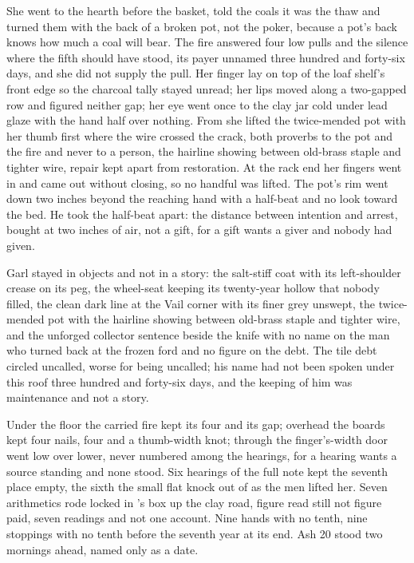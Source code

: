 She went to the hearth before the basket, told the coals it was the thaw and turned them with the back of a broken pot, not the poker, because a pot's back knows how much a coal will bear. The fire answered four low pulls and the silence where the fifth should have stood, its payer unnamed three hundred and forty-six days, and she did not supply the pull. Her finger lay on top of the loaf shelf's front edge so the charcoal tally stayed unread; her lips moved along a two-gapped row and figured neither gap; her eye went once to the clay jar cold under lead glaze with the hand half over nothing. From  she lifted the twice-mended pot with her thumb first where the wire crossed the crack, both proverbs to the pot and the fire and never to a person, the hairline showing between old-brass staple and tighter wire, repair kept apart from restoration. At the rack end her fingers went in and came out without closing, so no handful was lifted. The pot's rim went down two inches beyond the reaching hand with a half-beat and no look toward the bed. He took the half-beat apart: the distance between intention and arrest, bought at two inches of air, not a gift, for a gift wants a giver and nobody had given.

Garl stayed in objects and not in a story: the salt-stiff coat with its left-shoulder crease on its peg, the wheel-seat keeping its twenty-year hollow that nobody filled, the clean dark line at the Vail corner with its finer grey unswept, the twice-mended pot with the hairline showing between old-brass staple and tighter wire, and the unforged collector sentence beside the knife with no name on the man who turned back at the frozen ford and no figure on the debt. The tile debt circled uncalled, worse for being uncalled; his name had not been spoken under this roof three hundred and forty-six days, and the keeping of him was maintenance and not a story.

Under the floor the carried fire kept its four and its gap; overhead the boards kept four nails, four and a thumb-width knot; through the finger's-width door  went low over lower, never numbered among the hearings, for a hearing wants a source standing and none stood. Six hearings of the full note kept the seventh place empty, the sixth the small flat knock out of  as the men lifted her. Seven arithmetics rode locked in 's box up the clay road, figure read still not figure paid, seven readings and not one account. Nine hands with no tenth, nine stoppings with no tenth before the seventh year at its end. Ash 20 stood two mornings ahead, named only as a date.

